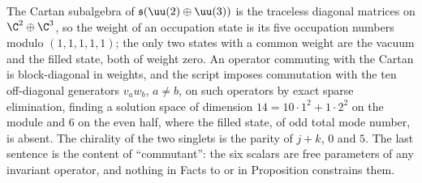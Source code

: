 The Cartan subalgebra of $\mathfrak{s}(\uu(2) \oplus \uu(3))$ is the traceless diagonal matrices on $\C^{2} \oplus \C^{3}$, so the weight of an occupation state is its five occupation numbers modulo $(1,1,1,1,1)$; the only two states with a common weight are the vacuum and the filled state, both of weight zero. An operator commuting with the Cartan is block-diagonal in weights, and the script imposes commutation with the ten off-diagonal generators $v_{a}w_{b}$, $a \ne b$, on such operators by exact sparse elimination, finding a solution space of dimension $14 = 10 \cdot 1^{2} + 1 \cdot 2^{2}$ on the module and $6$ on the even half, where the filled state, of odd total mode number, is absent. The chirality of the two singlets is the parity of $j + k$, $0$ and $5$. The last sentence is the content of ``commutant'': the six scalars are free parameters of any invariant operator, and nothing in Facts  to  or in Proposition  constrains them.
